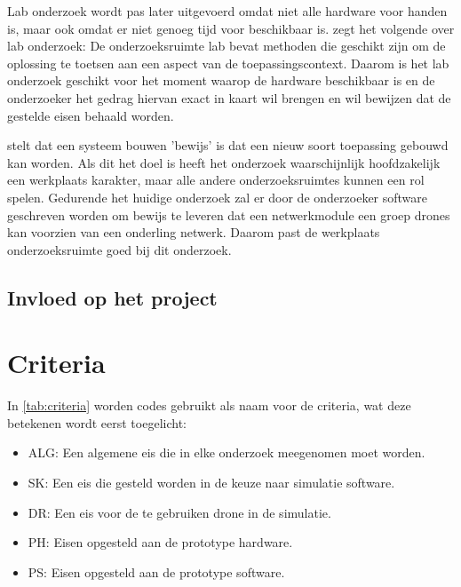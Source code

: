 \documentclass[a4paper, 11pt, oneside]{report}
\begin{document}
Lab onderzoek wordt pas later uitgevoerd omdat niet alle hardware voor handen is, maar ook omdat er niet genoeg tijd voor beschikbaar is.
\citeauthor{MethodenKaart} zegt het volgende over lab onderzoek: De onderzoeksruimte lab bevat methoden die geschikt zijn om de oplossing te toetsen aan een aspect van de toepassingscontext.
Daarom is het lab onderzoek geschikt voor het moment waarop de hardware beschikbaar is en de onderzoeker het gedrag hiervan exact in kaart wil brengen en wil bewijzen dat de gestelde eisen behaald worden.

 stelt dat een systeem bouwen 'bewijs' is dat een nieuw soort toepassing gebouwd kan worden. Als dit het doel is heeft het onderzoek waarschijnlijk hoofdzakelijk een werkplaats karakter, maar alle andere onderzoeksruimtes kunnen een rol spelen.
Gedurende het huidige onderzoek zal er door de onderzoeker software geschreven worden om bewijs te leveren dat een netwerkmodule een groep drones kan voorzien van een onderling netwerk.
Daarom past de werkplaats onderzoeksruimte goed bij dit onderzoek.


\section{Invloed op het project}



\chapter{Criteria}
\label{chapter:criteria}

In \autoref{tab:criteria} worden codes gebruikt als naam voor de criteria, wat deze betekenen wordt eerst toegelicht:
\begin{itemize}
	\item ALG: Een algemene eis die in elke onderzoek meegenomen moet worden.
	\item SK: Een eis die gesteld worden in de keuze naar simulatie software.
	\item DR: Een eis voor de te gebruiken drone in de simulatie.
	\item PH: Eisen opgesteld aan de prototype hardware.
	\item PS: Eisen opgesteld aan de prototype software.
\end{itemize}
\end{document}
